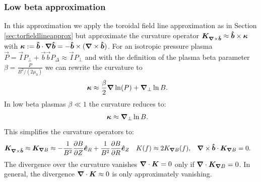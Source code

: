 \subsubsection{Low beta approximation}\label{sec:lowbetaapprox}
In this approximation we apply the toroidal field line approximation
as in Section
\ref{sec:torfieldlineapprox}
but approximate the curvature operator $ {{\boldsymbol{K}}_{{\boldsymbol{\nabla}}\times\bm{\hat{b}}}} \approx \bm{\hat{b}}\times{\boldsymbol{\kappa}}$
  with
  ${\boldsymbol{\kappa}} := \bm{\hat{b}} \cdot{\boldsymbol{\nabla}}\bm{\hat{b}} = -\bm{\hat{b}} \times( {\boldsymbol{\nabla}}\times \bm{\hat{b}})$.
For an isotropic pressure plasma \(\vec{P} = \vec{I} P_\perp + \vec{b} \vec{b} P_\Delta \approx \vec{I} P_\perp\) and with the definition of the plasma beta parameter
\(\beta = \frac{P}{B^2/(2 \mu_0) } \)
we can rewrite the curvature to
\begin{align}
    {\boldsymbol{\kappa}} &\approx \frac{\beta}{2} {\boldsymbol{\nabla}} \ln(P) +{\boldsymbol{\nabla}}_{\perp} \ln{B} .
\end{align}
In low beta plasmas \(\beta\ll1\) the curvature reduces to:
\begin{align}
    {\boldsymbol{\kappa}} & \approx {\boldsymbol{\nabla}}_{\perp} \ln{B} .
\end{align}
This simplifies the curvature operators to:
\begin{align}
{{\boldsymbol{K}}_{{\boldsymbol{\nabla}}\times\bm{\hat{b}}}} \approx {{\boldsymbol{K}}_{{\boldsymbol{\nabla}}B}}
  &\approx  -\frac{1}{B^2}\frac{\partial B}{\partial Z}\bm{\hat{e}}_R +\frac{1}{B^2} \frac{\partial B}{\partial R}\bm{\hat{e}}_Z &
{K} (f) &\approx 2{K}_{{\boldsymbol{\nabla}}  B} (f) , &
    {\boldsymbol{\nabla}}\times\bm{\hat{b}} \cdot {{\boldsymbol{K}}_{{\boldsymbol{\nabla}}B}} &= 0.
\end{align}
The divergence over the curvature vanishes \( {\boldsymbol{\nabla}}\cdot {\boldsymbol{ {K} }} = 0\) only if \( {\boldsymbol{\nabla}}\cdot {{\boldsymbol{K}}_{{\boldsymbol{\nabla}}B}}   = 0\).
In general, the divergence \( {\boldsymbol{\nabla}}\cdot {\boldsymbol{ {K} }} \approx 0\) is only approximately vanishing.

